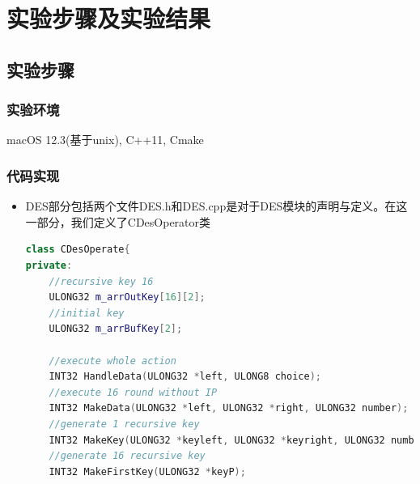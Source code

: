 \documentclass[UTF8,a4paper,10pt]{ctexart}
\begin{document}
\section{实验步骤及实验结果}
\subsection{实验步骤}
\subsubsection{实验环境}
macOS 12.3(基于unix), C++11, Cmake
\subsubsection{代码实现}
\begin{itemize}
  \item DES部分包括两个文件DES.h和DES.cpp是对于DES模块的声明与定义。在这一部分，我们定义了CDesOperator类
  \begin{lstlisting}[language = c++]
class CDesOperate{
private:
    //recursive key 16
	ULONG32 m_arrOutKey[16][2];
    //initial key
    ULONG32 m_arrBufKey[2];

    //execute whole action
    INT32 HandleData(ULONG32 *left, ULONG8 choice);
    //execute 16 round without IP
    INT32 MakeData(ULONG32 *left, ULONG32 *right, ULONG32 number);
    //generate 1 recursive key
    INT32 MakeKey(ULONG32 *keyleft, ULONG32 *keyright, ULONG32 number);
    //generate 16 recursive key
    INT32 MakeFirstKey(ULONG32 *keyP);


\end{lstlisting}
\end{itemize}
\end{document}
